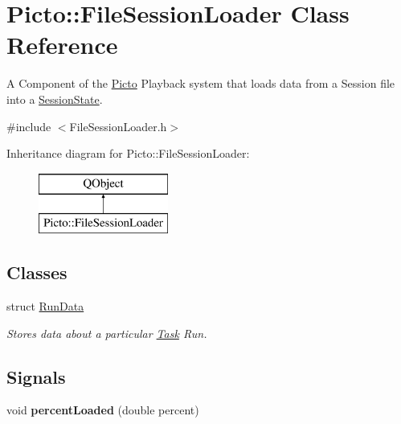 \hypertarget{class_picto_1_1_file_session_loader}{\section{Picto\-:\-:File\-Session\-Loader Class Reference}
\label{class_picto_1_1_file_session_loader}
}


A Component of the \hyperlink{namespace_picto}{Picto} Playback system that loads data from a Session file into a \hyperlink{class_picto_1_1_session_state}{Session\-State}.  




{\ttfamily \#include $<$File\-Session\-Loader.\-h$>$}

Inheritance diagram for Picto\-:\-:File\-Session\-Loader\-:\begin{figure}[H]
\begin{center}
\leavevmode
\includegraphics[height=2.000000cm]{class_picto_1_1_file_session_loader}
\end{center}
\end{figure}
\subsection*{Classes}
\begin{DoxyCompactItemize}
\item 
struct \hyperlink{struct_picto_1_1_file_session_loader_1_1_run_data}{Run\-Data}
\begin{DoxyCompactList}\small\item\em Stores data about a particular \hyperlink{class_picto_1_1_task}{Task} Run. \end{DoxyCompactList}\end{DoxyCompactItemize}
\subsection*{Signals}
\begin{DoxyCompactItemize}
\item 
\hypertarget{class_picto_1_1_file_session_loader_a7b474201de33f1d5828c998fcdcc94bb}{void {\bfseries percent\-Loaded} (double percent)}\label{class_picto_1_1_file_session_loader_a7b474201de33f1d5828c998fcdcc94bb}

\end{DoxyCompactItemize}
